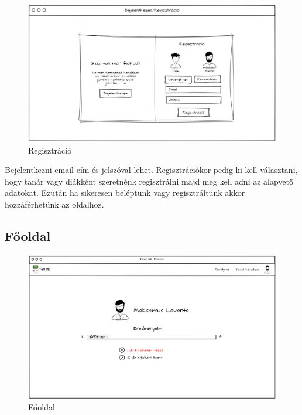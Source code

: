 \begin{figure}[H]
    \centering
    \includegraphics[width=\linewidth]{images/signin_wireframe.png}
    \caption{Regisztráció}
    \label{fig:signin_wireframe}
\end{figure}

Bejelentkezni  email cím és jelszóval lehet. Regisztrációkor  pedig ki kell választani, hogy tanár vagy diákként szeretnénk regisztrálni majd meg kell adni az alapvető adatokat.
Ezután ha sikeresen beléptünk vagy regisztráltunk akkor hozzáférhetünk az oldalhoz.

\subsection{Főoldal}

\begin{figure}[H]
    \centering
    \includegraphics[width=\linewidth]{images/main_login_wireframe.png}
    \caption{Főoldal}
    \label{fig:main_page}
\end{figure}

